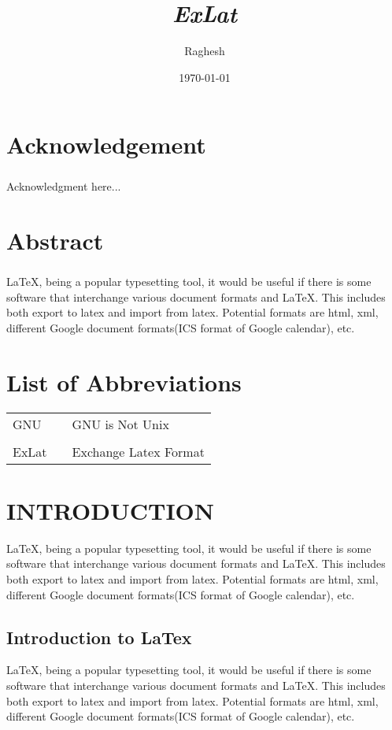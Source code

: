 \documentclass[a4paper,10pt]{mesreport}
\title{\emph{ExLat}}
\author{{Raghesh}}
\date{\today}
\begin{document}
\maketitle

\chapter*{Acknowledgement}
\thispagestyle{empty}
\paragraph{} Acknowledgment here...

\chapter*{Abstract}
\paragraph{}

LaTeX, being a popular typesetting tool, it would be useful if there is some software that interchange
various document formats and LaTeX. This includes both export to latex and import from latex.
Potential formats are html, xml, different Google document formats(ICS format of Google calendar), etc.

\tableofcontents
\listoffigures
\chapter*{List of Abbreviations}

\begin{tabular}{ l l  l } 

GNU &  &GNU is Not Unix\\
\\
ExLat &  &Exchange Latex Format

\end{tabular} 

\newpage

\chapter{INTRODUCTION}
LaTeX, being a popular typesetting tool, it would be useful if there is some software that interchange
various document formats and LaTeX. This includes both export to latex and import from latex.
Potential formats are html, xml, different Google document formats(ICS format of Google calendar), etc.
\section{Introduction to LaTex}
LaTeX, being a popular typesetting tool, it would be useful if there is some software that interchange
various document formats and LaTeX. This includes both export to latex and import from latex.
Potential formats are html, xml, different Google document formats(ICS format of Google calendar), etc.
\end{document}
